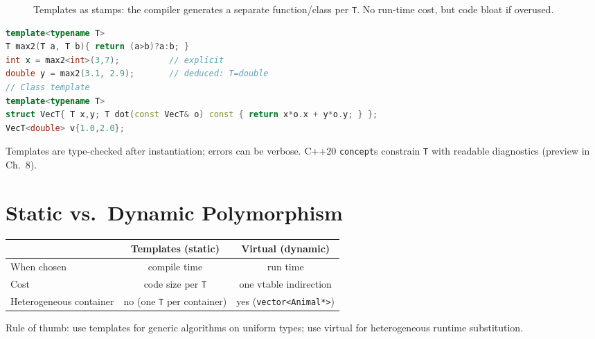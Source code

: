 \begin{figure}[h]\centering
{}
\caption{Templates as stamps: the compiler generates a separate function/class per \texttt{T}. No run-time cost, but code bloat if overused.}
\label{fig:template-stamp}
\end{figure}

\begin{lstlisting}[language=C++]
template<typename T>
T max2(T a, T b){ return (a>b)?a:b; }
int x = max2<int>(3,7);          // explicit
double y = max2(3.1, 2.9);       // deduced: T=double
// Class template
template<typename T>
struct VecT{ T x,y; T dot(const VecT& o) const { return x*o.x + y*o.y; } };
VecT<double> v{1.0,2.0};
\end{lstlisting}
Templates are type-checked after instantiation; errors can be verbose. C++20 \texttt{concept}s constrain \texttt{T} with readable diagnostics (preview in Ch.~8).

\section{Static vs.\ Dynamic Polymorphism}
\begin{center}\small
\begin{tabular}{lcc}
\toprule & Templates (static) & Virtual (dynamic)\\
\midrule When chosen & compile time & run time\\
Cost & code size per \texttt{T} & one vtable indirection\\
Heterogeneous container & no (one \texttt{T} per container) & yes (\texttt{vector<Animal*>})\\
\bottomrule
\end{tabular}
\end{center}
Rule of thumb: use templates for generic algorithms on uniform types; use virtual for heterogeneous runtime substitution.



